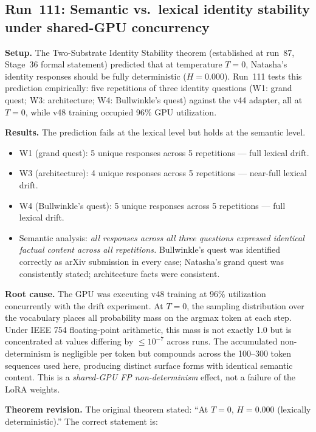\documentclass[11pt]{article}
\begin{document}
\subsection{Run~111: Semantic vs.\ lexical identity stability under shared-GPU concurrency}

\textbf{Setup.} The Two-Substrate Identity Stability theorem (established at run~87, Stage~36 formal statement) predicted that at temperature $T=0$, Natasha's identity responses should be fully deterministic ($H=0.000$). Run~111 tests this prediction empirically: five repetitions of three identity questions (W1: grand quest; W3: architecture; W4: Bullwinkle's quest) against the v44 adapter, all at $T=0$, while v48 training occupied 96\% GPU utilization.

\textbf{Results.} The prediction fails at the lexical level but holds at the semantic level.

\begin{itemize}
  \item W1 (grand quest): 5 unique responses across 5 repetitions --- full lexical drift.
  \item W3 (architecture): 4 unique responses across 5 repetitions --- near-full lexical drift.
  \item W4 (Bullwinkle's quest): 5 unique responses across 5 repetitions --- full lexical drift.
  \item Semantic analysis: \emph{all responses across all three questions expressed identical factual content across all repetitions.} Bullwinkle's quest was identified correctly as arXiv submission in every case; Natasha's grand quest was consistently stated; architecture facts were consistent.
\end{itemize}

\textbf{Root cause.} The GPU was executing v48 training at 96\% utilization concurrently with the drift experiment. At $T=0$, the sampling distribution over the vocabulary places all probability mass on the argmax token at each step. Under IEEE 754 floating-point arithmetic, this mass is not exactly 1.0 but is concentrated at values differing by $\leq 10^{-7}$ across runs. The accumulated non-determinism is negligible per token but compounds across the 100--300 token sequences used here, producing distinct surface forms with identical semantic content. This is a \emph{shared-GPU FP non-determinism} effect, not a failure of the LoRA weights.

\textbf{Theorem revision.} The original theorem stated: ``At $T=0$, $H=0.000$ (lexically deterministic).'' The correct statement is:
\end{document}
